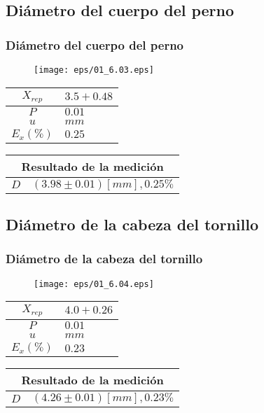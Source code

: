 \documentclass[letter,11pt]{beamer}
\begin{document}
\subsection{Diámetro del cuerpo del perno}
\begin{frame}
\frametitle{Diámetro del cuerpo del perno}
\vspace*{0.8cm}
\begin{figure}
\centering
\texttt{[image: eps/01\_6.03.eps]}
\end{figure}
\vspace*{0.4cm}
\scriptsize
\begin{tabular}{|c|>{\centering}m{1.8cm}<{\centering}|}
\hline
$X_{rep}$ &  $3.5+0.48$ \tabularnewline \hline
      $P$ &      $0.01$ \tabularnewline \hline
      $u$ &        $mm$ \tabularnewline \hline
$E_x(\%)$ &      $0.25$ \tabularnewline \hline
\end{tabular}
\quad
\begin{tabular}{|c|>{\centering}m{5.7cm}<{\centering}|}
\hline
\multicolumn{2}{|c|}{\textbf{Resultado de la medición}} \\ \hline
$D$ & $( 3.98\pm0.01)[mm], 0.25\%$ \tabularnewline \hline
\end{tabular}
\end{frame}

\subsection{Diámetro de la cabeza del tornillo}
\begin{frame}
\frametitle{Diámetro de la cabeza del tornillo}
\vspace*{0.8cm}
\begin{figure}
\centering
\texttt{[image: eps/01\_6.04.eps]}
\end{figure}
\vspace*{0.4cm}
\scriptsize
\begin{tabular}{|c|>{\centering}m{1.8cm}<{\centering}|}
\hline
$X_{rep}$ &  $4.0+0.26$ \tabularnewline \hline
      $P$ &      $0.01$ \tabularnewline \hline
      $u$ &        $mm$ \tabularnewline \hline
$E_x(\%)$ &      $0.23$ \tabularnewline \hline
\end{tabular}
\quad
\begin{tabular}{|c|>{\centering}m{5.7cm}<{\centering}|}
\hline
\multicolumn{2}{|c|}{\textbf{Resultado de la medición}} \\ \hline
$D$ & $( 4.26\pm0.01)[mm], 0.23\%$ \tabularnewline \hline
\end{tabular}
\end{frame}
\end{document}
